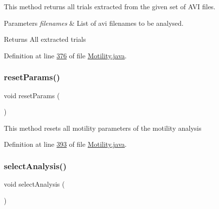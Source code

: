 This method returns all trials extracted from the given set of A\+VI files.


\begin{DoxyParams}{Parameters}
{\em filenames} & List of avi filenames to be analysed. \\
\hline
\end{DoxyParams}
\begin{DoxyReturn}{Returns}
All extracted trials 
\end{DoxyReturn}


Definition at line \hyperlink{_motility_8java_source_l00376}{376} of file \hyperlink{_motility_8java_source}{Motility.\+java}.

\hypertarget{classanalysis_1_1_motility_a20915c32899c4bbe4d08e483bd5eb09c}{}\label{classanalysis_1_1_motility_a20915c32899c4bbe4d08e483bd5eb09c} 
\subsubsection{\texorpdfstring{reset\+Params()}{resetParams()}}
{\footnotesize\ttfamily void reset\+Params (\begin{DoxyParamCaption}{ }\end{DoxyParamCaption})\hspace{0.3cm}{\ttfamily [private]}}

This method resets all motility parameters of the motility analysis 

Definition at line \hyperlink{_motility_8java_source_l00393}{393} of file \hyperlink{_motility_8java_source}{Motility.\+java}.

\hypertarget{classanalysis_1_1_motility_aef66a58ab7f95817a68a3429550562fc}{}\label{classanalysis_1_1_motility_aef66a58ab7f95817a68a3429550562fc} 
\subsubsection{\texorpdfstring{select\+Analysis()}{selectAnalysis()}}
{\footnotesize\ttfamily void select\+Analysis (\begin{DoxyParamCaption}{ }\end{DoxyParamCaption})}

